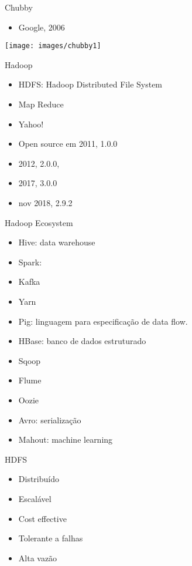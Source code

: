 
\begin{frame}{Chubby}
	\begin{itemize}
		\item Google, 2006
	\end{itemize}
	\texttt{[image: images/chubby1]}
\end{frame}





\begin{frame}{Hadoop}
\begin{itemize}
	\item HDFS: Hadoop Distributed File System
	\item Map Reduce
	\item Yahoo!
	\item Open source em 2011, 1.0.0
	\item 2012, 2.0.0,
	\item 2017, 3.0.0
	\item nov 2018, 2.9.2
\end{itemize}
\end{frame}


\begin{frame}{Hadoop Ecosystem}
\begin{itemize}
	\item Hive: data warehouse
	\item Spark: 
	\item Kafka
	\item Yarn
	\item Pig: linguagem para especificação de data flow.
	\item HBase: banco de dados estruturado
	\item Sqoop
	\item Flume
	\item Oozie
	\item Avro: serialização
	\item Mahout: machine learning
\end{itemize}
\end{frame}



\begin{frame}{HDFS}
\begin{itemize}
	\item Distribuído
	\item Escalável
	\item Cost effective
	\item Tolerante a falhas
	\item Alta vazão
\end{itemize}
\end{frame}


